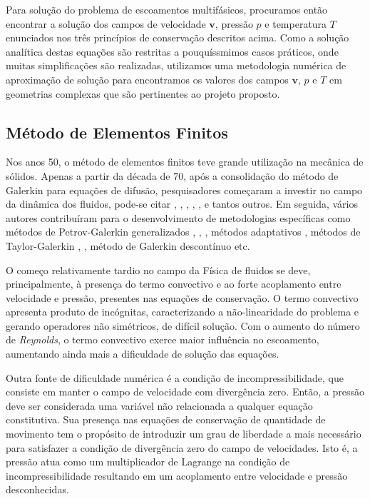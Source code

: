 \documentclass[a4paper,portuges]{article}
\newcommand{\vvet}{\mathbf{v}}
\begin{document}
Para solução do problema de escoamentos multifásicos, procuramos então
encontrar a solução dos campos de velocidade $\vvet$, pressão $p$ e
temperatura $T$ enunciados nos três princípios de conservação descritos
acima. Como a solução analítica destas equações são restritas a
pouquíssmimos casos práticos, onde muitas simplificações são realizadas,
utilizamos uma metodologia numérica de aproximação de solução para
encontramos os valores dos campos $\vvet$, $p$ e $T$ em geometrias
complexas que são pertinentes ao projeto proposto. 

\subsection{Método de Elementos Finitos}
Nos anos 50, o método de elementos finitos teve grande utilização na
mecânica de sólidos.  Apenas a partir da década de 70, após a
consolidação do método de Galerkin para equações de difusão,
pesquisadores começaram a investir no campo da dinâmica dos fluidos,
pode-se citar \cite{zienkiewicz1965}, \cite{oden1972}, \cite{oden1998},
\cite{chung1978}, \cite{hughes1982}, \cite{pironneau1989} e tantos
outros.  Em seguida, vários autores contribuíram para o desenvolvimento
de metodologias específicas como métodos de Petrov-Galerkin
generalizados \cite{heinrich1977}, \cite{hughes1986},
\cite{johnson1987}, métodos adaptativos \cite{oden1989}, métodos de
Taylor-Galerkin \cite{donea1984}, \cite{lohner1985}, método de Galerkin
descontínuo \cite{oden1998} etc.

O começo relativamente tardio no campo da Física de fluidos se deve,
principalmente, à presença do termo convectivo e ao forte acoplamento
entre velocidade e pressão, presentes nas equações de conservação. O
termo convectivo apresenta produto de incógnitas, caracterizando a
não-linearidade do problema e gerando operadores não simétricos, de
difícil solução.  Com o aumento do número de \emph{Reynolds}, o termo
convectivo exerce maior influência no escoamento, aumentando ainda mais
a dificuldade de solução das equações.

Outra fonte de dificuldade numérica é a condição de incompressibilidade,
que consiste em manter o campo de velocidade com divergência zero.
Então, a pressão deve ser considerada uma variável não relacionada a
qualquer equação constitutiva.  Sua presença nas equações de conservação
de quantidade de movimento tem o propósito de introduzir um grau de
liberdade a mais necessário para satisfazer a condição de divergência
zero do campo de velocidades.  Isto é, a pressão atua como um
multiplicador de Lagrange na condição de incompressibilidade resultando
em um acoplamento entre velocidade e pressão desconhecidas.
\end{document}
